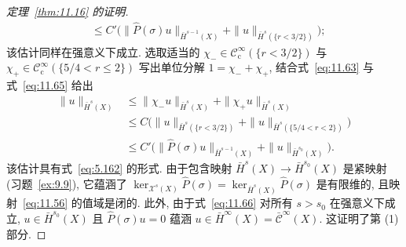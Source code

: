 \begin{proof}[定理~\ref{thm:11.16} 的证明]
\begin{equation}
\begin{aligned}
    &\le C' \big( \|\widehat{P}(\sigma) u\|_{\bar H^{s-1}(X)} + \|u\|_{\bar H^s(\{r < 3/2\})} \big);
\end{aligned}
\end{equation}
该估计同样在强意义下成立. 选取适当的 $\chi_- \in \mathcal{C}_{\mathrm{c}}^\infty(\{r < 3/2\})$ 与 $\chi_+ \in \mathcal{C}_{\mathrm{c}}^\infty(\{5/4 < r \le 2\})$ 写出单位分解 $1 = \chi_- + \chi_+$, 结合式~\eqref{eq:11.63} 与式~\eqref{eq:11.65} 给出
\begin{equation}\label{eq:11.66}
\begin{aligned}
    \|u\|_{\bar H^s(X)}
    &\le \|\chi_- u\|_{\bar H^s(X)} + \|\chi_+ u\|_{\bar H^s(X)} \\
    &\le C \big( \|u\|_{\bar H^s(\{r < 3/2\})} + \|u\|_{\bar H^s(\{5/4 < r < 2\})} \big) \\
    &\le C' \big( \|\widehat{P}(\sigma) u\|_{\bar H^{s-1}(X)} + \|u\|_{\bar H^{s_0}(X)} \big).
\end{aligned}
\end{equation}
该估计具有式~\eqref{eq:5.162} 的形式. 由于包含映射 $\bar H^s(X) \to \bar H^{s_0}(X)$ 是紧映射 (习题~\ref{ex:9.9}), 它蕴涵了 $\ker_{\mathcal{X}^s(X)} \widehat{P}(\sigma) = \ker_{\bar H^s(X)} \widehat{P}(\sigma)$ 是有限维的, 且映射~\eqref{eq:11.56} 的值域是闭的. 此外, 由于式~\eqref{eq:11.66} 对所有 $s > s_0$ 在强意义下成立, $u \in \bar H^{s_0}(X)$ 且 $\widehat{P}(\sigma) u = 0$ 蕴涵 $u \in \bar H^\infty(X) = \bar{\mathcal{C}}^\infty(X)$. 这证明了第 (1) 部分.


\end{proof}
